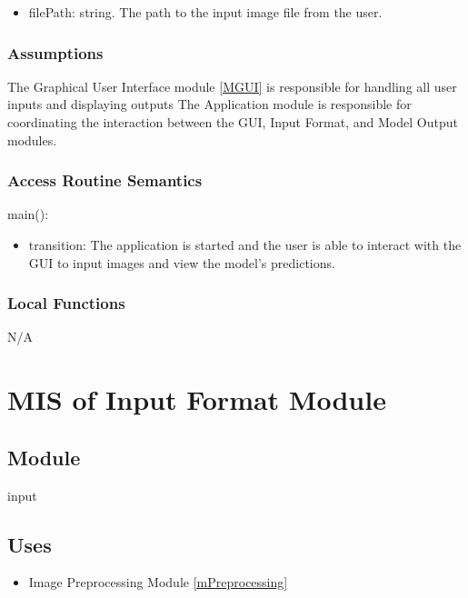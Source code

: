 \documentclass[12pt, titlepage]{article}
\begin{document}
\begin{itemize}
  \item filePath: string. The path to the input image file from the user.
\end{itemize}

\subsubsection{Assumptions}

The Graphical User Interface module \ref{MGUI} is responsible for handling all
user inputs and displaying outputs The Application module is responsible for
coordinating the interaction between the GUI, Input Format, and Model Output
modules.

\subsubsection{Access Routine Semantics}

\noindent main():
\begin{itemize}
\item transition: The application is started and the user is able to interact
with the GUI to input images and view the model's predictions.
\end{itemize}


\subsubsection{Local Functions}

N/A

\newpage
\section{MIS of Input Format Module} \label{MInput}

\subsection{Module}

input

\subsection{Uses}

\begin{itemize}
  \item Image Preprocessing Module \ref{mPreprocessing}
\end{itemize}
\end{document}
